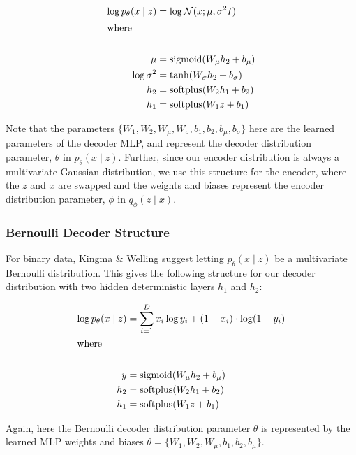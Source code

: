 \documentclass{article} %
\numberwithin{figure}{section}
\begin{document}
\begin{align*}
    \log p_\theta(x\mid z) &= \log \mathcal{N}(x; \mu, \sigma^2 I)\\
    \intertext{where}\\
    \mu &= \text{sigmoid}(W_\mu h_2 + b_\mu)\\
    \log \sigma^2 &= \text{tanh}(W_\sigma h_2+ b_\sigma)\\
    h_2 &= \text{softplus}(W_{2} h_1 + b_{2})\\
    h_1 &= \text{softplus}(W_{1} z + b_{1})
\end{align*}

Note that the parameters $\{W_1,W_2,W_\mu,W_\sigma,b_1,b_2,b_\mu,b_\sigma\}$ here are the learned parameters of the decoder MLP, and represent the decoder distribution parameter, $\theta$ in $p_\theta(x\mid z)$. Further, since our encoder distribution is always a multivariate Gaussian distribution, we use this structure for the encoder, where the $z$ and $x$ are swapped and the weights and biases represent the encoder distribution parameter, $\phi$ in ${q_\phi(z \mid x)}$.

\subsubsection{Bernoulli Decoder Structure}
For binary data, Kingma \& Welling suggest letting ${p_\theta(x\mid z)}$ be a multivariate Bernoulli distribution. This gives the following structure for our decoder distribution with two hidden deterministic layers $h_1$ and $h_2$:

\begin{align*}
    \log p_\theta(x\mid z) &= \sum_{i=1}^D x_i \log y_i + (1-x_i) \cdot \log (1-y_i)\\
    \intertext{where}\\
    y&=\text{sigmoid}(W_\mu h_2 + b_\mu)\\
    h_2&= \text{softplus}(W_2 h_1 +b_2)\\
    h_1 &= \text{softplus}(W_1 z + b_1)\\
\end{align*}

Again, here the Bernoulli decoder distribution parameter $\theta$ is represented by the learned MLP weights and biases $\theta = \{W_1,W_2,W_\mu,b_1,b_2,b_\mu\}$.
\end{document}

